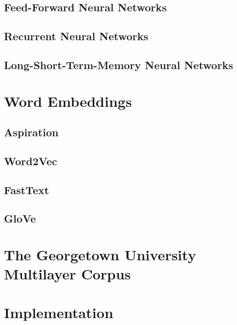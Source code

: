 \documentclass[12pt]{article}
\begin{document}
\subsection{Feed-Forward Neural Networks}
\label{nn_ff}


\subsection{Recurrent Neural Networks}
\label{nn_rnn}


\subsection{Long-Short-Term-Memory Neural Networks}
\label{nn_lstm}



\section{Word Embeddings}
\label{we}

\subsection{Aspiration}
\label{word_asp}


\subsection{Word2Vec}
\label{word_w2v}


\subsection{FastText}
\label{word_fasttext}


\subsection{GloVe}
\label{word_glove}




\section{The Georgetown University Multilayer Corpus} %

\label{gum}


\section{Implementation}
\end{document}
